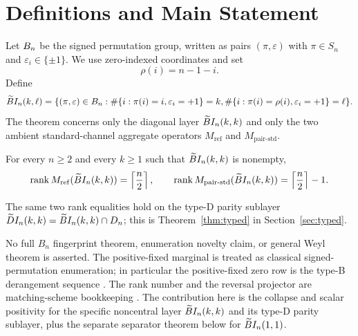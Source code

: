 \section{Definitions and Main Statement}\label{sec:defs}

Let $B_n$ be the signed permutation group, written as pairs $(\pi,\varepsilon)$ with $\pi\in S_n$ and
$\varepsilon_i\in\{\pm1\}$.  We use zero-indexed coordinates and set
\[
  \rho(i)=n-1-i.
\]
Define
\[
\widetilde{B}I_n(k,\ell)=\{(\pi,\varepsilon)\in B_n:
  \#\{i:\pi(i)=i,\varepsilon_i=+1\}=k,
  \#\{i:\pi(i)=\rho(i),\varepsilon_i=+1\}=\ell\}.
\]
The theorem concerns only the diagonal layer $\widetilde{B}I_n(k,k)$ and only the two ambient standard-channel aggregate
operators $M_{\mathrm{ref}}$ and $M_{\mathrm{pair\text{-}std}}$.

\begin{theorem}\label{thm:main}
For every $n\ge2$ and every $k\ge1$ such that $\widetilde{B}I_n(k,k)$ is nonempty,
\[
  \operatorname{rank} M_{\mathrm{ref}}(\widetilde{B}I_n(k,k))=\left\lceil\frac n2\right\rceil,
  \qquad
  \operatorname{rank} M_{\mathrm{pair\text{-}std}}(\widetilde{B}I_n(k,k))=\left\lceil\frac n2\right\rceil-1.
\]
\end{theorem}

The same two rank equalities hold on the type-D parity sublayer $\widetilde{D}I_n(k,k)=\widetilde{B}I_n(k,k)\cap D_n$; this is
Theorem~\ref{thm:typed} in Section~\ref{sec:typed}.

\begin{remark}[Boundary]
No full $B_n$ fingerprint theorem, enumeration novelty claim, or general Weyl theorem is asserted.
The positive-fixed marginal is treated as classical signed-permutation enumeration; in particular the
positive-fixed zero row is the type-B derangement sequence \cite{OEISA000354,ChenZhang2007}.  The rank number and the
reversal projector are matching-scheme bookkeeping \cite{Delsarte1973,BannaiIto1984,GodsilRoyle2001}.  The contribution here is the
collapse and scalar positivity for the specific noncentral layer $\widetilde{B}I_n(k,k)$ and its type-D parity sublayer, plus
the separate separator theorem below for $\widetilde{B}I_n(1,1)$.
\end{remark}
